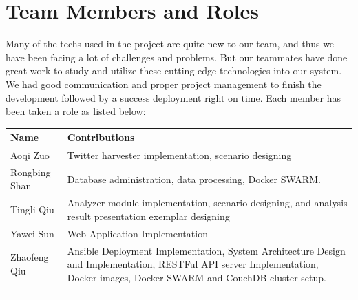 \documentclass{article}
\begin{document}
\section{Team Members and Roles}
Many of the techs used in the project are quite new to our team, and thus we have been facing a lot of challenges and problems. But our teammates have done great work to study and utilize these cutting edge technologies into our system. We had good communication and proper project management to finish the development followed by a success deployment right on time. Each member has been taken a role as listed below:

\begin{tabularx}{0.95\linewidth}{%
	>{\raggedright\arraybackslash}l
	>{\raggedright\arraybackslash}X%
	}
    \toprule
    Name & Contributions\\
    \midrule
    Aoqi Zuo 
    & Twitter harvester implementation, scenario designing
    \\
    \midrule
    Rongbing Shan 
    & Database administration, data processing, Docker SWARM.
    \\
    \midrule
    Tingli Qiu 
    & Analyzer module implementation, scenario designing, and analysis result presentation exemplar designing 
    \\
    \midrule
    Yawei Sun 
    & Web Application Implementation
    \\
    \midrule
    Zhaofeng Qiu 
    & Ansible Deployment Implementation, System Architecture Design and Implementation, RESTFul API server Implementation, Docker images, Docker SWARM and CouchDB cluster setup.
    \\
    \bottomrule
    \\
    \caption{Team Members and Roles}
    \label{tab:my_label}
\end{tabularx}


\end{document}
